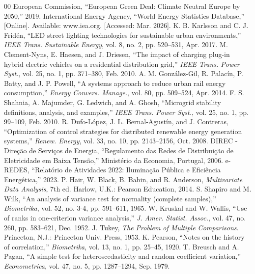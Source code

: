 \documentclass[conference]{IEEEtran}
\begin{document}
\begin{thebibliography}{00}
 European Commission, ``European Green Deal: Climate Neutral Europe by 2050,'' 2019.
 International Energy Agency, ``World Energy Statistics Database,'' [Online]. Available: www.iea.org. [Accessed: Mar. 2026].
 K. B. Karlsson and C. J. Fridén, ``LED street lighting technologies for sustainable urban environments,'' \textit{IEEE Trans. Sustainable Energy}, vol. 8, no. 2, pp. 520--531, Apr. 2017.
 M. Clement-Nyns, E. Haesen, and J. Driesen, ``The impact of charging plug-in hybrid electric vehicles on a residential distribution grid,'' \textit{IEEE Trans. Power Syst.}, vol. 25, no. 1, pp. 371--380, Feb. 2010.
 A. M. González-Gil, R. Palacín, P. Batty, and J. P. Powell, ``A systems approach to reduce urban rail energy consumption,'' \textit{Energy Convers. Manage.}, vol. 80, pp. 509--524, Apr. 2014.
 F. S. Shahnia, A. Majumder, G. Ledwich, and A. Ghosh, ``Microgrid stability definitions, analysis, and examples,'' \textit{IEEE Trans. Power Syst.}, vol. 25, no. 1, pp. 99--109, Feb. 2010.
 R. Dufo-López, J. L. Bernal-Agustín, and J. Contreras, ``Optimization of control strategies for distributed renewable energy generation systems,'' \textit{Renew. Energy}, vol. 33, no. 10, pp. 2143--2156, Oct. 2008.
 DIREC - Direção de Serviços de Energia, ``Regulamento das Redes de Distribuição de Eletricidade em Baixa Tensão,'' Ministério da Economia, Portugal, 2006.
 e-REDES, ``Relatório de Atividades 2022: Iluminação Pública e Eficiência Energética,'' 2023.
 P. Hair, W. Black, B. Babin, and R. Anderson, \textit{Multivariate Data Analysis}, 7th ed. Harlow, U.K.: Pearson Education, 2014.
 S. Shapiro and M. Wilk, ``An analysis of variance test for normality (complete samples),'' \textit{Biometrika}, vol. 52, no. 3-4, pp. 591--611, 1965.
 W. Kruskal and W. Wallis, ``Use of ranks in one-criterion variance analysis,'' \textit{J. Amer. Statist. Assoc.}, vol. 47, no. 260, pp. 583--621, Dec. 1952.
 J. Tukey, \textit{The Problem of Multiple Comparisons}. Princeton, N.J.: Princeton Univ. Press, 1953.
 K. Pearson, ``Notes on the history of correlation,'' \textit{Biometrika}, vol. 13, no. 1, pp. 25--45, 1920.
 T. Breusch and A. Pagan, ``A simple test for heteroscedasticity and random coefficient variation,'' \textit{Econometrica}, vol. 47, no. 5, pp. 1287--1294, Sep. 1979.
\end{thebibliography}
\end{document}
